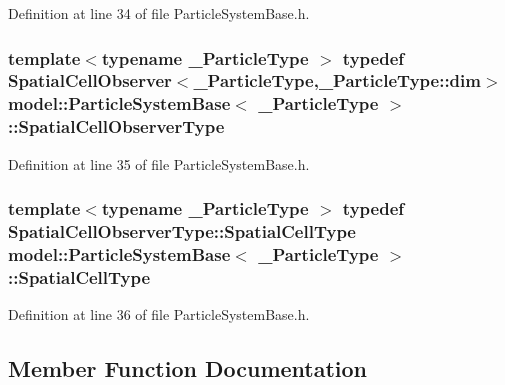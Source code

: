 Definition at line 34 of file Particle\+System\+Base.\+h.

\hypertarget{classmodel_1_1_particle_system_base_a6577788626cdac7c3596faf05f9f30f2}{}
\subsubsection[{Spatial\+Cell\+Observer\+Type}]{\setlength{\rightskip}{0pt plus 5cm}template$<$typename \+\_\+\+Particle\+Type $>$ typedef {\bf Spatial\+Cell\+Observer}$<$\+\_\+\+Particle\+Type,{\bf \+\_\+\+Particle\+Type\+::dim}$>$ {\bf model\+::\+Particle\+System\+Base}$<$ \+\_\+\+Particle\+Type $>$\+::{\bf Spatial\+Cell\+Observer\+Type}}\label{classmodel_1_1_particle_system_base_a6577788626cdac7c3596faf05f9f30f2}


Definition at line 35 of file Particle\+System\+Base.\+h.

\hypertarget{classmodel_1_1_particle_system_base_a8de0382d851a8968d757f91bad3a408e}{}
\subsubsection[{Spatial\+Cell\+Type}]{\setlength{\rightskip}{0pt plus 5cm}template$<$typename \+\_\+\+Particle\+Type $>$ typedef {\bf Spatial\+Cell\+Observer\+Type\+::\+Spatial\+Cell\+Type} {\bf model\+::\+Particle\+System\+Base}$<$ \+\_\+\+Particle\+Type $>$\+::{\bf Spatial\+Cell\+Type}}\label{classmodel_1_1_particle_system_base_a8de0382d851a8968d757f91bad3a408e}


Definition at line 36 of file Particle\+System\+Base.\+h.



\subsection{Member Function Documentation}
\hypertarget{classmodel_1_1_particle_system_base_af46a59ca7fae7d8e7f291e3a6c6bb436}{}
